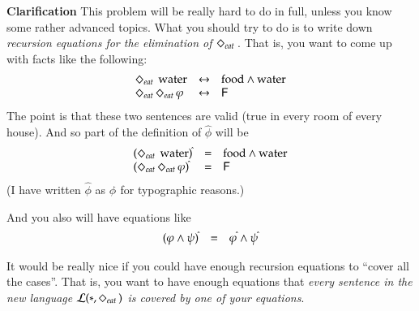 \documentclass[12pt]{article}
\newcommand{\sw}{*}
\begin{document}
{\bf Clarification}
This problem will be really hard to do in full, unless you know some rather advanced topics.
What you should try to do is to write down \emph{recursion equations for the elimination of $\Diamond_{\scriptstyle eat}\,$}.
That is, you want to come up with facts like the following:
\[
\begin{array}{lcl}
\Diamond_{\scriptstyle eat}\,\ \mbox{water} & \leftrightarrow & \mbox{food} \wedge\mbox{water} \\
\Diamond_{\scriptstyle eat}\, \Diamond_{\scriptstyle eat}\, \varphi  & \leftrightarrow & {\sf F} \\
\end{array}
\]
The point is that these two sentences are valid (true in every room of every house).
And so part of the definition of $\widehat{\phi}$ will be 
\[
\begin{array}{lcl}
(\Diamond_{\scriptstyle eat}\,\ \mbox{water})^{\hat{}}& = & \mbox{food} \wedge\mbox{water} \\
(\Diamond_{\scriptstyle eat}\, \Diamond_{\scriptstyle eat}\, \varphi )^{\hat{}} & = & {\sf F} \\
\end{array}
\]
(I have written  $\widehat{\phi}$ as $\phi^{\hat{}}$ for typographic reasons.)

And you also will have equations like
\[
\begin{array}{lcl}
(\varphi\wedge\psi)^{\hat{}}& = & \varphi^{\hat{}} \wedge \psi^{\hat{}}\\
\end{array}
\]

It would be really nice if you could have enough recursion equations to ``cover all the cases''.
That is, you want to have enough equations that \emph{every sentence in the new language $\lang(\sw,\eat)$ is covered
by one of your equations}.
\end{document}
